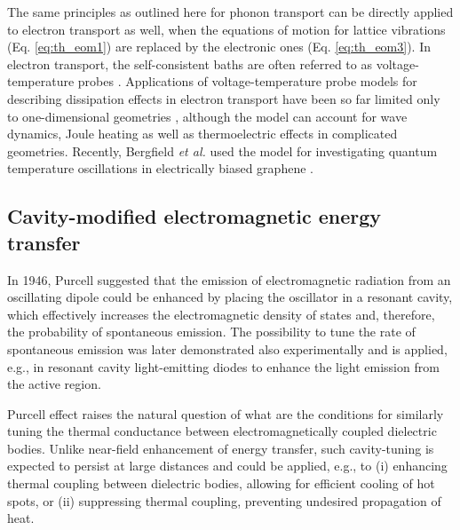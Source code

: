 The same principles as outlined here for phonon transport can be directly applied to electron transport as well, when the equations of motion for lattice vibrations (Eq. \eqref{eq:th_eom1}) are replaced by the electronic ones (Eq. \eqref{eq:th_eom3}). In electron transport, the self-consistent baths are often referred to as voltage-temperature probes \cite{jacquet09}. Applications of voltage-temperature probe models for describing dissipation effects in electron transport have been so far limited only to one-dimensional geometries \cite{buttiker86,damato90,jacquet09,jacquet12}, although the model can account for wave dynamics, Joule heating as well as thermoelectric effects \cite{roy07} in complicated geometries. Recently, Bergfield \textit{et al.} used the model for investigating quantum temperature oscillations in electrically biased graphene \cite{bergfield15}. 

\subsection{Cavity-modified electromagnetic energy transfer}
\label{sec:results_cavity}

In 1946, Purcell \cite{purcell46} suggested that the emission of electromagnetic radiation from an oscillating dipole could be enhanced by placing the oscillator in a resonant cavity, which effectively increases the electromagnetic density of states and, therefore, the probability of spontaneous emission. The possibility to tune the rate of spontaneous emission was later demonstrated also experimentally \cite{hulet85}\cite{martini87} and is applied, e.g., in resonant cavity light-emitting diodes \cite{schubert92} to enhance the light emission from the active region.

Purcell effect raises the natural question of what are the conditions for similarly tuning the thermal conductance between electromagnetically coupled dielectric bodies. Unlike near-field enhancement of energy transfer, such cavity-tuning is expected to persist at large distances and could be applied, e.g., to (i) enhancing thermal coupling between dielectric bodies, allowing for efficient cooling of hot spots, or (ii) suppressing thermal coupling, preventing undesired propagation of heat.

